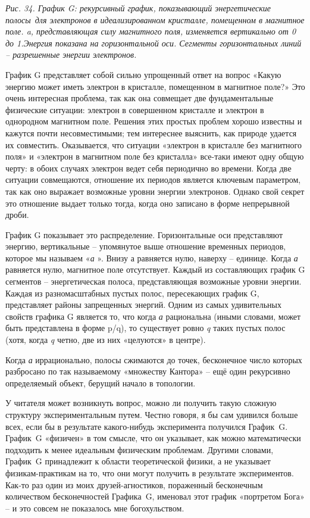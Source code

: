\documentclass[../main.tex]{subfiles}
\begin{document}
\emph{Рис. 34. График G: рекурсивный график, показывающий энергетические полосы~для электронов в идеализированном кристалле, помещенном в магнитное поле. a, представляющая силу магнитного поля, изменяется вертикально от 0 до 1.Энергия показана на горизонтальной оси. Сегменты горизонтальных линий \--- разрешенные энергии электронов.}

График G представляет собой сильно упрощенный ответ на вопрос «Какую энергию может иметь электрон в кристалле, помещенном в магнитное поле?» Это очень интересная проблема, так как она совмещает две фундаментальные физические ситуации: электрон в совершенном кристалле и электрон в однородном магнитном поле. Решения этих простых проблем хорошо известны и кажутся почти несовместимыми; тем интереснее выяснить, как природе удается их совместить. Оказывается, что ситуации «электрон в кристалле без магнитного поля» и «электрон в магнитном поле без кристалла» все-таки имеют одну общую черту: в обоих случаях электрон ведет себя периодично во времени. Когда две ситуации совмещаются, отношение их периодов является ключевым параметром, так как оно выражает возможные уровни энергии электронов. Однако свой секрет это отношение выдает только тогда, когда оно записано в форме непрерывной дроби.

График G показывает это распределение. Горизонтальные оси представляют энергию, вертикальные \--- упомянутое выше отношение временных периодов, которое мы называем «\emph{а} ». Внизу а равняется нулю, наверху \--- единице. Когда \emph{а} равняется нулю, магнитное поле отсутствует. Каждый из составляющих график G сегментов \--- энергетическая полоса, представляющая возможные уровни энергии. Каждая из разномасштабных пустых полос, пересекающих график G, представляет районы запрещенных энергий. Одним из самых удивительных свойств графика G является то, что когда \emph{а} рациональна (иными словами, может быть представлена в форме p/q), то существует ровно \emph{q} таких пустых полос (хотя, когда \emph{q} четно, две из них «целуются» в центре).

Когда \emph{а} иррационально, полосы сжимаются до точек, бесконечное число которых разбросано по так называемому «множеству Кантора» \--- ещё один рекурсивно определяемый объект, берущий начало в топологии.

У читателя может возникнуть вопрос, можно ли получить такую сложную структуру экспериментальным путем. Честно говоря, я бы сам удивился больше всех, если бы в результате какого-нибудь эксперимента получился График~G\@. График~G «физичен» в том смысле, что он указывает, как можно математически подходить к менее идеальным физическим проблемам. Другими словами, График~G принадлежит к области теоретической физики, а не указывает физикам-практикам на то, что они могут получить в результате экспериментов. Как-то раз один из моих друзей-агностиков, пораженный бесконечным количеством бесконечностей Графика~G, именовал этот график «портретом Бога» \--- и это совсем не показалось мне богохульством.
\end{document}

